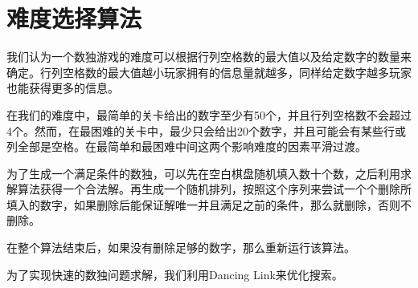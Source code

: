 \documentclass[11pt,a4paper]{article}
\begin{document}
\section{难度选择算法}
我们认为一个数独游戏的难度可以根据行列空格数的最大值以及给定数字的数量来确定。行列空格数的最大值越小玩家拥有的信息量就越多，同样给定数字越多玩家也能获得更多的信息。

在我们的难度中，最简单的关卡给出的数字至少有50个，并且行列空格数不会超过4个。然而，在最困难的关卡中，最少只会给出20个数字，并且可能会有某些行或列全部是空格。在最简单和最困难中间这两个影响难度的因素平滑过渡。

为了生成一个满足条件的数独，可以先在空白棋盘随机填入数十个数，之后利用求解算法获得一个合法解。再生成一个随机排列，按照这个序列来尝试一个个删除所填入的数字，如果删除后能保证解唯一并且满足之前的条件，那么就删除，否则不删除。

在整个算法结束后，如果没有删除足够的数字，那么重新运行该算法。

为了实现快速的数独问题求解，我们利用Dancing Link来优化搜索。
\end{document}

